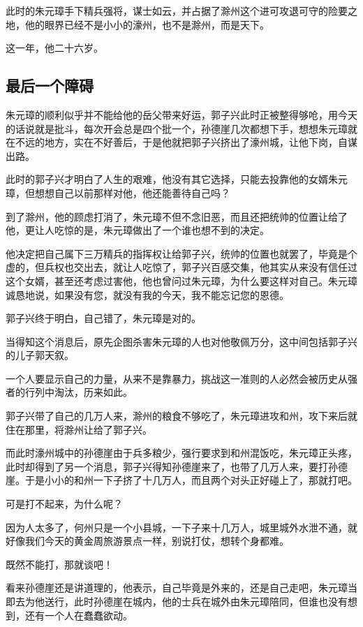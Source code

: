 \begin{multicols}{\theparacolNo}
		此时的朱元璋手下精兵强将，谋士如云，并占据了滁州这个进可攻退可守的险要之地，他的眼界已经不是小小的濠州，也不是滁州，而是天下。

		这一年，他二十六岁。

		\subsection{最后一个障碍}
		朱元璋的顺利似乎并不能给他的岳父带来好运，郭子兴此时正被整得够呛，用今天的话说就是批斗，每次开会总是四个批一个，孙德崖几次都想下手，想想朱元璋就在不远的地方，实在不好善后，于是他就把郭子兴挤出了濠州城，让他下岗，自谋出路。

		此时的郭子兴才明白了人生的艰难，他没有其它选择，只能去投靠他的女婿朱元璋，但想想自己以前那样对他，他还能善待自己吗？

		到了滁州，他的顾虑打消了，朱元璋不但不念旧恶，而且还把统帅的位置让给了他，更让人吃惊的是，朱元璋做出了一个谁也想不到的决定。

		他决定把自己属下三万精兵的指挥权让给郭子兴，统帅的位置也就罢了，毕竟是个虚的，但兵权也交出去，就让人吃惊了，郭子兴百感交集，他其实从来没有信任过这个女婿，甚至还考虑过害他，他也曾问过朱元璋，为什么要这样对自己。朱元璋诚恳地说，如果没有您，就没有我的今天，我不能忘记您的恩德。

		郭子兴终于明白，自己错了，朱元璋是对的。

		当得知这个消息后，原先企图杀害朱元璋的人也对他敬佩万分，这中间包括郭子兴的儿子郭天叙。

		一个人要显示自己的力量，从来不是靠暴力，挑战这一准则的人必然会被历史从强者的行列中淘汰，历来如此。

		郭子兴带了自己的几万人来，滁州的粮食不够吃了，朱元璋进攻和州，攻下来后就住在那里，将滁州让给了郭子兴。

		而此时濠州城中的孙德崖由于兵多粮少，强行要求到和州混饭吃，朱元璋正头疼，此时却得到了另一个消息，郭子兴得知孙德崖来了，也带了几万人来，要打孙德崖。于是小小的和州一下子挤了十几万人，而且两个对头正好碰上了，那就打吧。

		可是打不起来，为什么呢？

		因为人太多了，何州只是一个小县城，一下子来十几万人，城里城外水泄不通，就好像我们今天的黄金周旅游景点一样，别说打仗，想转个身都难。

		既然不能打，那就谈吧！

		看来孙德崖还是讲道理的，他表示，自己毕竟是外来的，还是自己走吧，朱元璋当即去为他送行，此时孙德崖在城内，他的士兵在城外由朱元璋陪同，但谁也没有想到，还有一个人在蠢蠢欲动。


\end{multicols}
